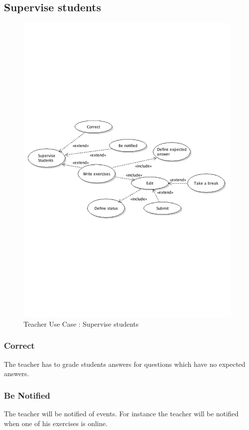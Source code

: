 	\subsection{Supervise students}
		\begin{figure}[ht]
			\begin{center}
				\includegraphics[width=\textwidth,  trim=2cm 10cm 2cm 10cm]{UML_figure/UC/teacher/UC_Teacher_Supervise.pdf}
				\caption{Teacher Use Case : Supervise students}
			\end{center}
		\end{figure}
		\subsubsection{Correct}
			The teacher has to grade students answers for questions which have no expected answers.
		\subsubsection{Be Notified}
			The teacher will be notified of events.
			For instance the teacher will be notified when one of his exercises is online.
